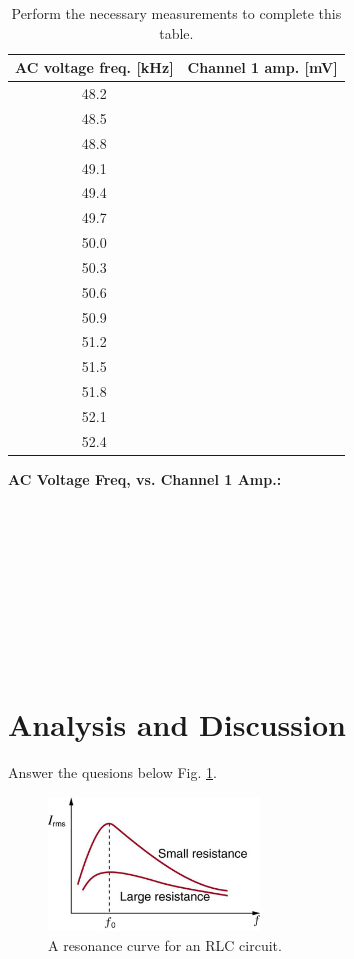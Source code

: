 \documentclass[12pt,twocolumn]{article}
\begin{document}
\begin{table}[ht]
\footnotesize
\begin{tabular}{| c | c |}
\hline
\textbf{AC voltage freq.} [kHz] & \textbf{Channel 1 amp.} [mV] \\ \hline
48.2 & \\ \hline
48.5 & \\ \hline
48.8 & \\ \hline
49.1 & \\ \hline
49.4 & \\ \hline
49.7 & \\ \hline
50.0 & \\ \hline
50.3 & \\ \hline
50.6 & \\ \hline
50.9 & \\ \hline
51.2 & \\ \hline
51.5 & \\ \hline
51.8 & \\ \hline
52.1 & \\ \hline
52.4 & \\ \hline
\end{tabular}
\caption{\label{tab:data} Perform the necessary measurements to complete this table.}
\end{table}

\noindent
\textbf{AC Voltage Freq, vs. Channel 1 Amp.:} \\ \\ \\ \\ \\ \\ \\ \\ \\ \\

\section{Analysis and Discussion}

Answer the quesions below Fig. \ref{fig:rlc_2}.

\begin{figure}[ht]
\centering
\includegraphics[width=0.5\textwidth]{RLC_2.jpeg}
\caption{\label{fig:rlc_2} A resonance curve for an RLC circuit.}
\end{figure}
\end{document}
